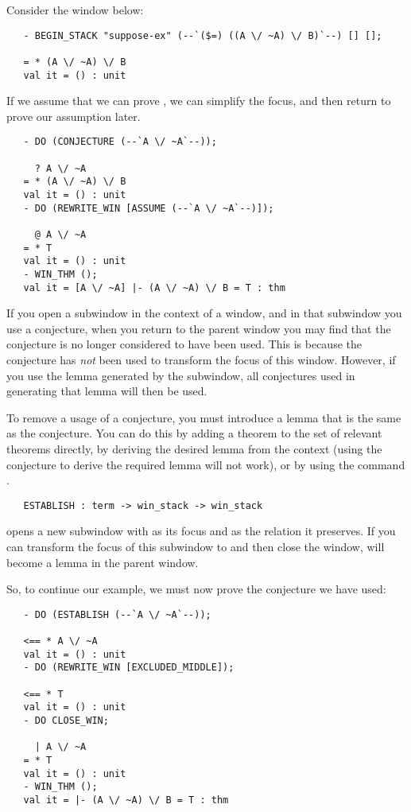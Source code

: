 Consider the window below:
\setcounter{sessioncount}{1}
\begin{session}\begin{verbatim}
   - BEGIN_STACK "suppose-ex" (--`($=) ((A \/ ~A) \/ B)`--) [] [];
   
   = * (A \/ ~A) \/ B
   val it = () : unit
\end{verbatim}\end{session}
If we assume that we can prove ,
we can simplify the focus, and then return to prove our assumption later.
\begin{session}\begin{verbatim}
   - DO (CONJECTURE (--`A \/ ~A`--));
   
     ? A \/ ~A
   = * (A \/ ~A) \/ B
   val it = () : unit
   - DO (REWRITE_WIN [ASSUME (--`A \/ ~A`--)]);
   
     @ A \/ ~A
   = * T
   val it = () : unit
   - WIN_THM ();
   val it = [A \/ ~A] |- (A \/ ~A) \/ B = T : thm
\end{verbatim}\end{session}

If you open a subwindow in the context of a window,
and in that subwindow you use a conjecture,
when you return to the parent window you may find that the conjecture is no
longer considered to have been used.
This is because the conjecture has {\it not\/} been used to transform the
focus of this window.
However, if you use the lemma generated by the subwindow,
all conjectures used in generating that lemma will then be used.

To remove a usage of a conjecture, you must introduce a lemma that is
the same as the conjecture.
You can do this by adding a theorem to the set of relevant theorems directly,
by deriving the desired lemma from the context
(using the conjecture to derive the required lemma will not work),
or by using the command .
\begin{boxed}\begin{verbatim}
   ESTABLISH : term -> win_stack -> win_stack
\end{verbatim}\end{boxed}
 opens a new subwindow with  as its focus and
 as the relation it preserves.
If you can transform the focus of this subwindow to  and then
close the window,  will become a lemma in the parent window.

So, to continue our example, we must now prove the conjecture we have used:
\begin{session}\begin{verbatim}
   - DO (ESTABLISH (--`A \/ ~A`--));
   
   <== * A \/ ~A
   val it = () : unit
   - DO (REWRITE_WIN [EXCLUDED_MIDDLE]);
   
   <== * T
   val it = () : unit
   - DO CLOSE_WIN;
   
     | A \/ ~A
   = * T
   val it = () : unit
   - WIN_THM ();
   val it = |- (A \/ ~A) \/ B = T : thm
\end{verbatim}\end{session}


